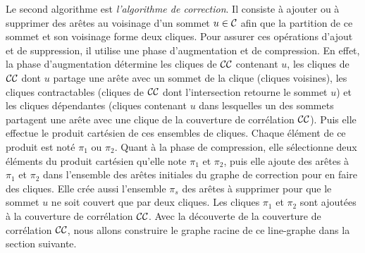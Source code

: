 Le second algorithme est {\em l'algorithme de correction}. Il consiste \`a ajouter ou \`a supprimer des ar\^etes au voisinage d'un sommet $u \in {\cal C}$ afin que la partition de ce sommet et son voisinage forme deux cliques. Pour assurer ces op\'erations d'ajout et de suppression, il utilise une phase d'augmentation et de compression. 
En effet, la phase d'augmentation d\'etermine les cliques de ${\cal CC}$ contenant $u$, les cliques de ${\cal CC}$  dont $u$ partage une ar\^ete avec un sommet de la clique (cliques voisines), les cliques contractables (cliques de ${\cal CC}$ dont l'intersection retourne le sommet $u$) et les cliques d\'ependantes (cliques contenant $u$ dans lesquelles un des sommets partagent une ar\^ete avec une clique de la couverture de corr\'elation ${\cal CC}$). 
Puis elle effectue le produit cart\'esien de ces ensembles de cliques. Chaque \'el\'ement de ce produit est not\'e $\pi_1$ ou $\pi_2$.
Quant \`a la phase de compression, elle s\'electionne deux \'el\'ements du produit cart\'esien qu'elle note  $\pi_1$ et $\pi_2$, puis elle ajoute des ar\^etes \`a  $\pi_1$ et $\pi_2$ dans l'ensemble des ar\^etes initiales du graphe de correction pour en faire des cliques. Elle cr\'ee aussi l'ensemble $\pi_s$ des ar\^etes \`a supprimer pour que le sommet $u$ ne soit couvert que par deux cliques. 
Les cliques $\pi_1$ et $\pi_2$ sont ajout\'ees \`a la couverture de corr\'elation ${\cal CC}$. 
\newline
Avec la d\'ecouverte de la couverture de corr\'elation ${\cal CC}$, nous allons construire le graphe racine de ce line-graphe dans la section suivante.



